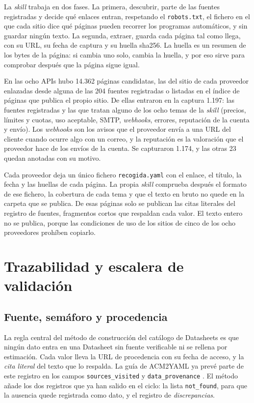 La \textit{skill} trabaja en dos fases.
La primera, descubrir, parte de las fuentes registradas y decide qué enlaces entran, respetando el \texttt{robots.txt}, el fichero en el que cada sitio dice qué páginas pueden recorrer los programas automáticos, y sin guardar ningún texto.
La segunda, extraer, guarda cada página tal como llega, con su URL, su fecha de captura y su huella sha256.
La huella es un resumen de los bytes de la página: si cambia uno solo, cambia la huella, y por eso sirve para comprobar después que la página sigue igual.

En las ocho APIs hubo 14.362 páginas candidatas, las del sitio de cada proveedor enlazadas desde alguna de las 204 fuentes registradas o listadas en el índice de páginas que publica el propio sitio.
De ellas entraron en la captura 1.197: las fuentes registradas y las que tratan alguno de los ocho temas de la \textit{skill} (precios, límites y cuotas, uso aceptable, SMTP, \textit{webhooks}, errores, reputación de la cuenta y envío).
Los \textit{webhooks} son los avisos que el proveedor envía a una URL del cliente cuando ocurre algo con un correo, y la reputación es la valoración que el proveedor hace de los envíos de la cuenta.
Se capturaron 1.174, y las otras 23 quedan anotadas con su motivo.

Cada proveedor deja un único fichero \texttt{recogida.yaml} con el enlace, el título, la fecha y las huellas de cada página.
La propia \textit{skill} comprueba después el formato de ese fichero, la cobertura de cada tema y que el texto en bruto no quede en la carpeta que se publica.
De esas páginas solo se publican las citas literales del registro de fuentes, fragmentos cortos que respaldan cada valor.
El texto entero no se publica, porque las condiciones de uso de los sitios de cinco de los ocho proveedores prohíben copiarlo.

\section{Trazabilidad y escalera de validación}
\label{sec:propuesta:trazabilidad}

\subsection{Fuente, semáforo y procedencia}
\label{sec:propuesta:semaforo}

La regla central del método de construcción del catálogo de Datasheets es que ningún dato entra en una Datasheet sin fuente verificable ni se rellena por estimación.
Cada valor lleva la URL de procedencia con su fecha de acceso, y la \textit{cita literal} del texto que lo respalda.
La guía de ACM2YAML ya prevé parte de este registro en los campos \texttt{sources\_visited} y \texttt{data\_provenance} \citep{apisconsumptionmodel}.
El método añade los dos registros que ya han salido en el ciclo: la lista \texttt{not\_found}, para que la ausencia quede registrada como dato, y el registro de \textit{discrepancias}.

